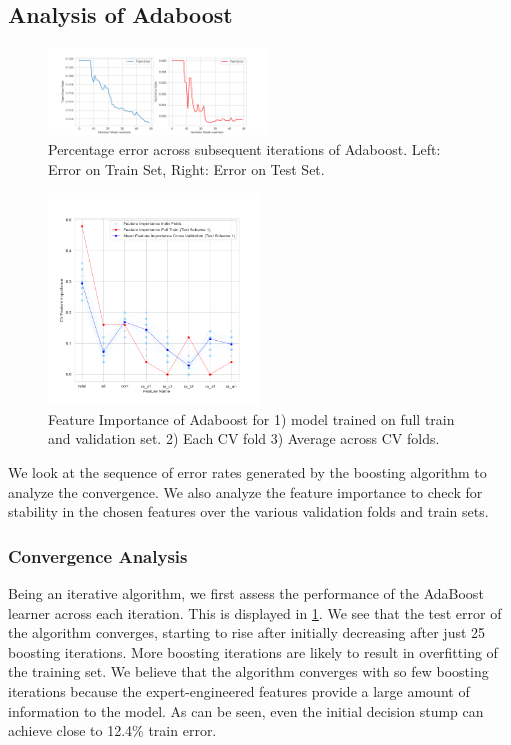 \documentclass[11pt, letterpaper, journal]{IEEEtran}
\begin{document}
\subsection{Analysis of Adaboost}
\begin{figure}[h]
    \centering
    \includegraphics[width=0.52\textwidth]{statics/ada_iterations_tr_23_te_1.png}
    \caption{Percentage error across subsequent iterations of Adaboost. Left: Error on Train Set, Right: Error on Test Set.}
    \label{fig:Adaboost_iterations}
\end{figure}

\begin{figure}[h]
    \centering
    \includegraphics[width=0.5\textwidth]{statics/Feature_importance_test_scheme1_tr_23_te_1.png}
    \caption{Feature Importance of Adaboost for 1) model trained on full train and validation set. 2) Each CV fold 3) Average across CV folds.}
    \label{fig:Feature_importance ts1}
\end{figure}

We look at the sequence of error rates generated by the boosting algorithm to analyze the convergence. We also analyze the feature importance to check for stability in the chosen features over the various validation folds and train sets.

\subsubsection{Convergence Analysis}
Being an iterative algorithm, we first assess the performance of the AdaBoost learner across each iteration. This is displayed in \ref{fig:Adaboost_iterations}. We see that the test error of the algorithm converges, starting to rise after initially decreasing after just 25 boosting iterations. More boosting iterations are likely to result in overfitting of the training set. We believe that the algorithm converges with so few boosting iterations because the expert-engineered features provide a large amount of information to the model. As can be seen, even the initial decision stump can achieve close to 12.4\% train error.
\end{document}
